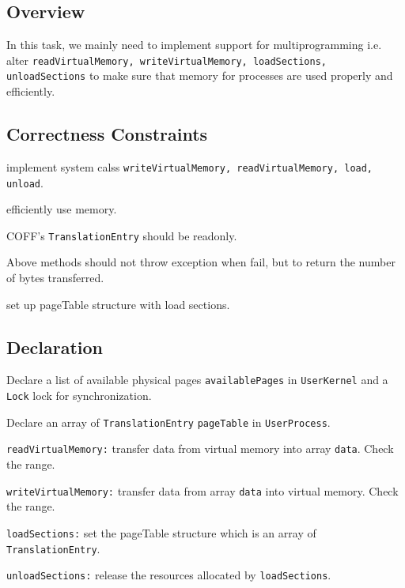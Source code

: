 \documentclass{article}
\begin{document}
\subsection{Overview}
In this task, we mainly need to implement support for multiprogramming i.e. alter \texttt{readVirtualMemory, writeVirtualMemory, loadSections,
unloadSections} to make sure that memory for processes are used properly and efficiently.
\subsection{Correctness Constraints}
\begin{compactitem}
\item implement system calss \texttt{writeVirtualMemory, readVirtualMemory, load, unload}.
\item efficiently use memory.
\item COFF's \texttt{TranslationEntry} should be readonly.
\item Above methods should not throw exception when fail, but to return the number of bytes transferred.
\item set up pageTable structure with load sections.
\end{compactitem}
\subsection{Declaration}
\begin{compactitem}
\item Declare a list of available physical pages \texttt{availablePages} in \texttt{UserKernel} and a \texttt{Lock} lock for synchronization.
\item Declare an array of \texttt{TranslationEntry} \texttt{pageTable} in \texttt{UserProcess}.
\item \texttt{readVirtualMemory:} transfer data from virtual memory into array \texttt{data}. Check the range.
\item \texttt{writeVirtualMemory:} transfer data from array \texttt{data} into virtual memory. Check the range.
\item \texttt{loadSections:} set the pageTable structure which is an array of \texttt{TranslationEntry}.
\item \texttt{unloadSections:} release the resources allocated by \texttt{loadSections}.
\end{compactitem}
\end{document}
